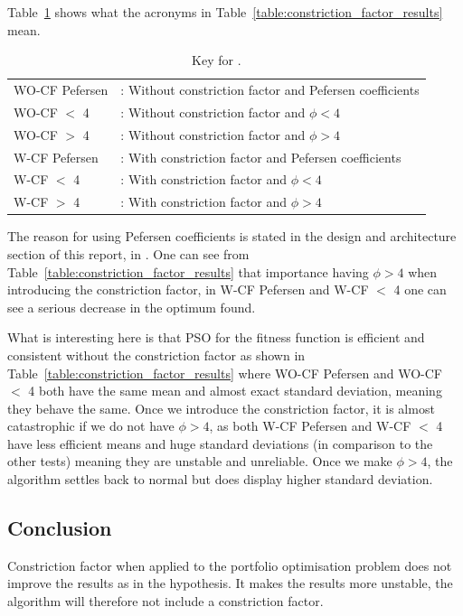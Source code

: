 \documentclass{pdfmx4020}
\begin{document}
      Table~\ref{table:key_constriction_factor_results} shows what the acronyms in Table~\ref{table:constriction_factor_results} mean. 

        \begin{table}[H]
          \setlength{\extrarowheight}{2.0pt}
          \begin{tabular}{ l l }
            WO-CF Pefersen & : Without constriction factor and Pefersen coefficients  \\
            WO-CF $<$ 4 & : Without constriction factor and $\phi < 4$ \\
            WO-CF $>$ 4 & : Without constriction factor and $\phi > 4$ \\
            W-CF Pefersen & : With constriction factor and Pefersen coefficients  \\
            W-CF $<$ 4 & : With constriction factor and $\phi < 4$ \\
            W-CF $>$ 4 & : With constriction factor and $\phi > 4$ \\
          \end{tabular}
          \caption{Key for .}
          \label{table:key_constriction_factor_results}
        \end{table}

      The reason for using Pefersen coefficients is stated in the design and architecture section of this report,  in . One can see from Table~\ref{table:constriction_factor_results} that importance having $\phi > 4$ when introducing the constriction factor, in W-CF Pefersen and W-CF $<$ 4 one can see a serious decrease in the optimum found. 

      What is interesting here is that PSO for the fitness function is efficient and consistent without the constriction factor as shown in Table~\ref{table:constriction_factor_results} where WO-CF Pefersen and WO-CF $<$ 4 both have the same mean and almost exact standard deviation, meaning they behave the same. Once we introduce the constriction factor, it is almost catastrophic if we do not have $\phi > 4$, as both W-CF Pefersen and W-CF $<$ 4 have less efficient means and huge standard deviations (in comparison to the other tests) meaning they are unstable and unreliable. Once we make $\phi > 4$, the algorithm settles back to normal but does display higher standard deviation. 
    \subsection{Conclusion} %
    \label{sub:conclusion}
      Constriction factor when applied to the portfolio optimisation problem does not improve the results as in the hypothesis. It makes the results more unstable, the algorithm will therefore not include a constriction factor. 
\end{document}
